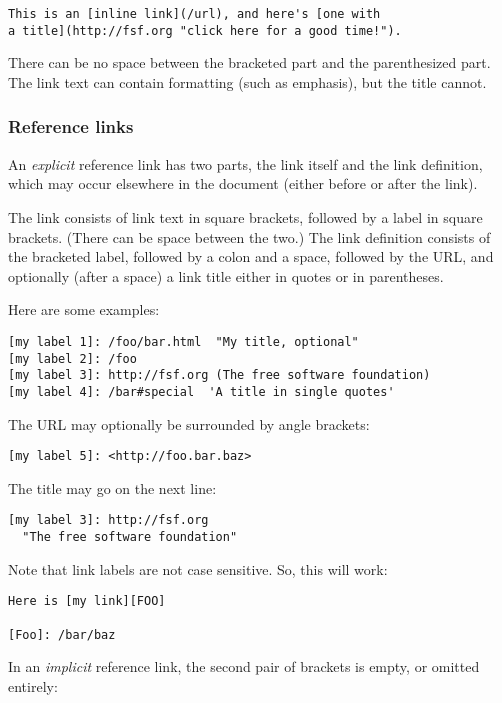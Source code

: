 \documentclass[]{article}
\begin{document}
\begin{verbatim}
This is an [inline link](/url), and here's [one with
a title](http://fsf.org "click here for a good time!").
\end{verbatim}

There can be no space between the bracketed part and the parenthesized
part. The link text can contain formatting (such as emphasis), but the
title cannot.

\subsubsection{Reference links}\label{reference-links}

An \emph{explicit} reference link has two parts, the link itself and the
link definition, which may occur elsewhere in the document (either
before or after the link).

The link consists of link text in square brackets, followed by a label
in square brackets. (There can be space between the two.) The link
definition consists of the bracketed label, followed by a colon and a
space, followed by the URL, and optionally (after a space) a link title
either in quotes or in parentheses.

Here are some examples:

\begin{verbatim}
[my label 1]: /foo/bar.html  "My title, optional"
[my label 2]: /foo
[my label 3]: http://fsf.org (The free software foundation)
[my label 4]: /bar#special  'A title in single quotes'
\end{verbatim}

The URL may optionally be surrounded by angle brackets:

\begin{verbatim}
[my label 5]: <http://foo.bar.baz>
\end{verbatim}

The title may go on the next line:

\begin{verbatim}
[my label 3]: http://fsf.org
  "The free software foundation"
\end{verbatim}

Note that link labels are not case sensitive. So, this will work:

\begin{verbatim}
Here is [my link][FOO]

[Foo]: /bar/baz
\end{verbatim}

In an \emph{implicit} reference link, the second pair of brackets is
empty, or omitted entirely:
\end{document}
